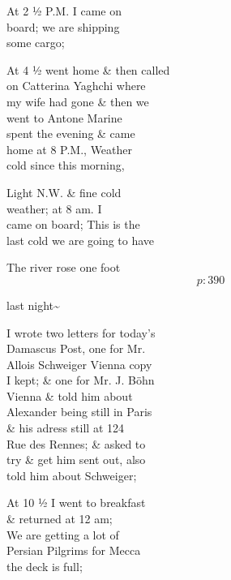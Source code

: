 \documentclass{report}
\begin{document}
	\par{
 	At 2 ½ P.M. I came on\ \\board; we are shipping\ \\some cargo;\ \\
	}

	\par{
 	At 4 ½ went home \& then called\ \\on Catterina Yaghchi where\ \\my wife had gone \& then we\ \\went to Antone Marine\ \\spent the evening \& came\ \\home at 8 P.M., Weather\ \\cold since this morning,\ \\
	}

	\par{
 	Light N.W. \& fine cold\ \\weather; at 8 am. I\ \\came on board; This is the\ \\last cold we are going to have\ \\
	}

	\par{
 	The river rose one foot\ \\
  \[p: 390 \]

	}

	\par{
 	last night\~{}\ \\
	}

	\par{
 	I wrote two letters for today’s\ \\Damascus Post, one for Mr.\ \\Allois Schweiger Vienna copy\ \\I kept; \& one for Mr. J. Böhn\ \\Vienna \& told him about\ \\Alexander being still in Paris\ \\\& his adress still at 124\ \\Rue des Rennes; \& asked to\ \\try \& get him sent out, also\ \\told him about Schweiger;\ \\
	}

	\par{
 	At 10 ½ I went to breakfast\ \\\& returned at 12 am;\ \\We are getting a lot of\ \\Persian Pilgrims for Mecca\ \\the deck is full;\ \\
	}
\end{document}
